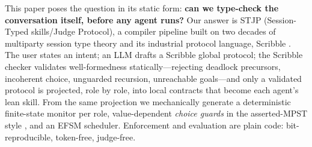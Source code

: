 \documentclass{article}
\newcommand{\stjp}{\textsc{STJP}}
\begin{document}
This paper poses the question in its static form: \textbf{can we type-check the conversation itself, before any agent runs?} Our answer is \stjp{} (Session-Typed skills/Judge Protocol), a compiler pipeline built on two decades of multiparty session type theory \citep{hyc08,scalas19} and its industrial protocol language, Scribble \citep{scribble}. The user states an intent; an LLM drafts a Scribble global protocol; the Scribble checker validates well-formedness statically---rejecting deadlock precursors, incoherent choice, unguarded recursion, unreachable goals---and only a validated protocol is projected, role by role, into local contracts that become each agent's lean skill. From the same projection we mechanically generate a deterministic finite-state monitor per role, value-dependent \emph{choice guards} in the asserted-MPST style \citep{bocchi10}, and an EFSM scheduler. Enforcement and evaluation are plain code: bit-reproducible, token-free, judge-free.
\end{document}
